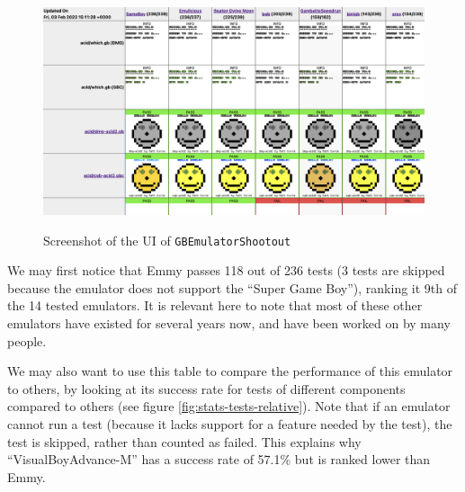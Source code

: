 \documentclass[11pt]{informatics-report}
\begin{document}
\begin{figure}[h]
    \centering
    \includegraphics[width=15cm]{images/gb-shootout}\\
    \caption{Screenshot of the UI of \texttt{GBEmulatorShootout}}
    \label{fig:gb-shootout}
\end{figure}

We may first notice that Emmy passes 118 out of 236 tests (3 tests are skipped because the emulator does not support the ``Super Game Boy''), ranking it 9th of the 14 tested emulators. It is relevant here to note that most of these other emulators have existed for several years now, and have been worked on by many people.

We may also want to use this table to compare the performance of this emulator to others, by looking at its success rate for tests of different components compared to others (see figure \ref{fig:stats-tests-relative}). Note that if an emulator cannot run a test (because it lacks support for a feature needed by the test), the test is skipped, rather than counted as failed. This explains why \mbox{``VisualBoyAdvance-M''} has a success rate of 57.1\% but is ranked lower than Emmy.
\end{document}
